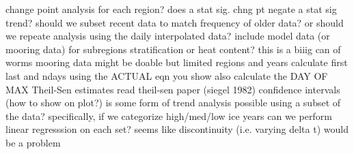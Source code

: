 \markdownRendererDocumentBegin
\markdownRendererUlBeginTight
\markdownRendererUlItem change point analysis for each region?\markdownRendererInterblockSeparator
{}\markdownRendererUlBeginTight
\markdownRendererUlItem does a stat sig. chng pt negate a stat sig trend?\markdownRendererUlItemEnd 
\markdownRendererUlEndTight \markdownRendererUlItemEnd 
\markdownRendererUlItem should we subset recent data to match frequency of older data? or should we repeate analysis using the daily interpolated data?\markdownRendererUlItemEnd 
\markdownRendererUlItem include model data (or mooring data) for subregions stratification or heat content? this is a biiig can of worms\markdownRendererUlItemEnd 
\markdownRendererUlItem mooring data might be doable but limited regions and years\markdownRendererUlItemEnd 
\markdownRendererUlItem calculate first last and ndays using the ACTUAL eqn you show\markdownRendererUlItemEnd 
\markdownRendererUlItem also calculate the DAY OF MAX\markdownRendererUlItemEnd 
\markdownRendererUlItem Theil-Sen estimates\markdownRendererUlItemEnd 
\markdownRendererUlItem read theil-sen paper (siegel 1982)\markdownRendererUlItemEnd 
\markdownRendererUlItem confidence intervals (how to show on plot?)\markdownRendererUlItemEnd 
\markdownRendererUlItem is some form of trend analysis possible using a subset of the data?\markdownRendererInterblockSeparator
{}\markdownRendererUlBeginTight
\markdownRendererUlItem specifically, if we categorize high/med/low ice years can we perform linear regresssion on each set?\markdownRendererUlItemEnd 
\markdownRendererUlItem seems like discontinuity (i.e. varying delta t) would be a problem\markdownRendererUlItemEnd 
\markdownRendererUlEndTight \markdownRendererUlItemEnd 
\markdownRendererUlEndTight \markdownRendererDocumentEnd